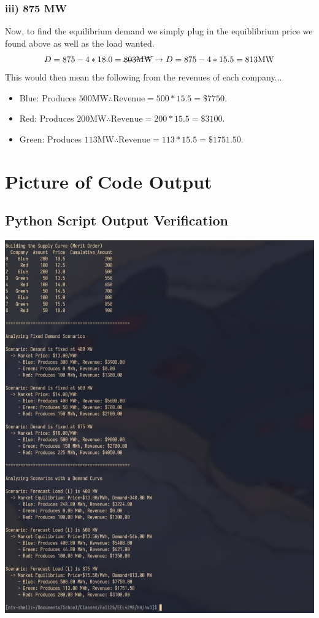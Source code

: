 \documentclass{article}
\begin{document}
\subsubsection{iii) 875 MW}
Now, to find the equilibrium demand we simply plug in the equiblibrium price we found above as well as the load wanted. 
$$ D = 875 - 4*18.0 = \cancel{803\text{MW}} \rightarrow D = 875 - 4*15.5 = 813\text{MW}$$
This would then mean the following from the revenues of each company...
\begin{itemize}
	\item Blue: Produces $500\text{MW} \therefore \text{Revenue} = 500*15.5=\$7750$.
	\item Red: Produces $200\text{MW} \therefore \text{Revenue} = 200*15.5=\$3100$.
	\item Green: Produces $113\text{MW} \therefore \text{Revenue} = 113*15.5=\$1751.50$.
\end{itemize}

\section{Picture of Code Output}
\subsection{Python Script Output Verification}
\includegraphics[width=\textwidth]{beta.png}
\end{document}
